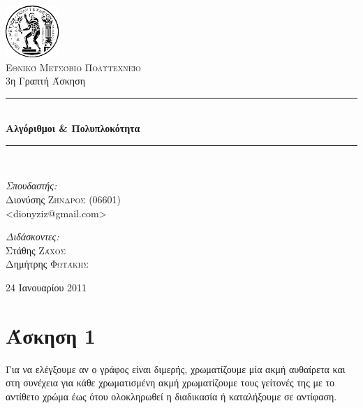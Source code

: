 \documentclass[11pt,a4paper]{book}
\newcommand{\HRule}{\rule{\linewidth}{0.5mm}}
\begin{document}
\begin{titlepage}
\begin{center}

\includegraphics[width=0.15\textwidth]{Pyrforos3.png}\\[1cm]
\textsc{\LARGE Εθνικό Μετσόβιο Πολυτεχνείο}\\[1.5cm]

\Large{ 3η Γραπτή Άσκηση }\\[0.5cm]

\begin{doublespace}
\HRule \\[0.4cm]
{\huge \bfseries
Αλγόριθμοι \& Πολυπλοκότητα
}\\[0.4cm]
\end{doublespace}

\HRule \\[1.5cm]

\begin{minipage}{0.4\textwidth}
\begin{flushleft} \large
\emph{Σπουδαστής:} \\
Διονύσης \textsc{Ζήνδρος} (06601)\\
\textlatin{\textless dionyziz@gmail.com\textgreater}
\end{flushleft}
\end{minipage}
\begin{minipage}{0.4\textwidth}
\begin{flushright} \large
\emph{Διδάσκοντες:} \\
Στάθης \textsc{Ζάχος}\\
Δημήτρης \textsc{Φωτάκης}
\end{flushright}
\end{minipage}

\vfill

{\large 24 Ιανουαρίου 2011}
\end{center}
\end{titlepage}

\section*{Άσκηση 1}
Για να ελέγξουμε αν ο γράφος είναι διμερής, χρωματίζουμε μία ακμή αυθαίρετα και στη συνέχεια για κάθε χρωματισμένη ακμή χρωματίζουμε τους γείτονές της με το αντίθετο χρώμα έως ότου ολοκληρωθεί η διαδικασία ή καταλήξουμε σε αντίφαση.
\end{document}
